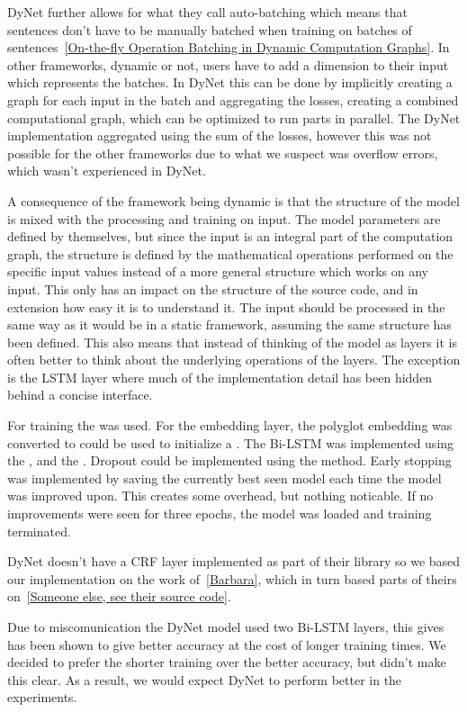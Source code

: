DyNet further allows for what they call auto-batching which means that sentences
don't have to be manually batched when training on batches of
sentences~\ref{On-the-fly Operation Batching in Dynamic Computation Graphs}. In
other frameworks, dynamic or not, users have to add a dimension to their input
which represents the batches. In DyNet this can be done by implicitly creating a
graph for each input in the batch and aggregating the losses, creating a
combined computational graph, which can be optimized to run parts in parallel.
The DyNet implementation aggregated using the sum of the losses, however this
was not possible for the other frameworks due to what we suspect was overflow
errors, which wasn't experienced in DyNet. 

A consequence of the framework being dynamic is that the structure of the model
is mixed with the processing and training on input. The model parameters are
defined by themselves, but since the input is an integral part of the
computation graph, the structure is defined by the mathematical operations
performed on the specific input values instead of a more general structure which
works on any input. This only has an impact on the structure of the source code,
and in extension how easy it is to understand it. The input should be processed
in the same way as it would be in a static framework, assuming the same
structure has been defined. This also means that instead of thinking of the
model as layers it is often better to think about the underlying operations of
the layers. The exception is the LSTM layer where much of the
implementation detail has been hidden behind a concise interface.

For training the  was used. For the embedding layer, the
polyglot embedding was converted to could be used to initialize a
. The Bi-LSTM was implemented using the
, and the . Dropout could be implemented
using the  method. Early stopping was implemented by saving the
currently best seen model each time the model was improved upon. This creates
some overhead, but nothing noticable. If no improvements were seen for three
epochs, the model was loaded and training terminated.

DyNet doesn't have a CRF layer implemented as part of their library so we based
our implementation on the work of~\ref{Barbara}, which in turn based parts of
theirs on~\ref{Someone else, see their source code}. 

Due to miscomunication the DyNet model used two Bi-LSTM layers, this gives has
been shown to give better accuracy at the cost of longer training times. We
decided to prefer the shorter training over the better accuracy, but didn't make
this clear. As a result, we would expect DyNet to perform better in the
experiments.

